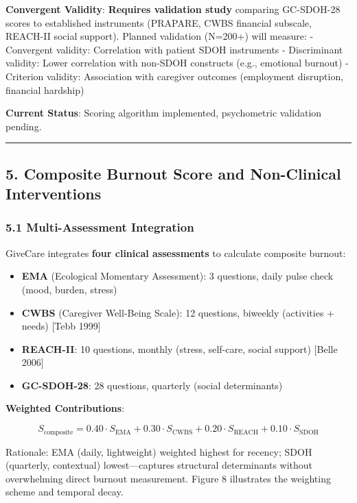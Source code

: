 \documentclass[
]{article}
\providecommand{\tightlist}{%
  \setlength{\itemsep}{0pt}\setlength{\parskip}{0pt}}
\begin{document}
\textbf{Convergent Validity}: \textbf{Requires validation study}
comparing GC-SDOH-28 scores to established instruments (PRAPARE, CWBS
financial subscale, REACH-II social support). Planned validation
(N=200+) will measure: - Convergent validity: Correlation with patient
SDOH instruments - Discriminant validity: Lower correlation with
non-SDOH constructs (e.g., emotional burnout) - Criterion validity:
Association with caregiver outcomes (employment disruption, financial
hardship)

\textbf{Current Status}: Scoring algorithm implemented, psychometric
validation pending.

\begin{center}\rule{0.5\linewidth}{0.5pt}\end{center}

\subsection{5. Composite Burnout Score and Non-Clinical
Interventions}\label{composite-burnout-score-and-non-clinical-interventions}

\subsubsection{5.1 Multi-Assessment
Integration}\label{multi-assessment-integration}

GiveCare integrates \textbf{four clinical assessments} to calculate
composite burnout:

\begin{itemize}
\tightlist
\item
  \textbf{EMA} (Ecological Momentary Assessment): 3 questions, daily
  pulse check (mood, burden, stress)
\item
  \textbf{CWBS} (Caregiver Well-Being Scale): 12 questions, biweekly
  (activities + needs) {[}Tebb 1999{]}
\item
  \textbf{REACH-II}: 10 questions, monthly (stress, self-care, social
  support) {[}Belle 2006{]}
\item
  \textbf{GC-SDOH-28}: 28 questions, quarterly (social determinants)
\end{itemize}

\textbf{Weighted Contributions}:

\[S_{\text{composite}} = 0.40 \cdot S_{\text{EMA}} + 0.30 \cdot S_{\text{CWBS}} + 0.20 \cdot S_{\text{REACH}} + 0.10 \cdot S_{\text{SDOH}}\]

Rationale: EMA (daily, lightweight) weighted highest for recency; SDOH
(quarterly, contextual) lowest---captures structural determinants
without overwhelming direct burnout measurement. Figure 8 illustrates
the weighting scheme and temporal decay.
\end{document}
